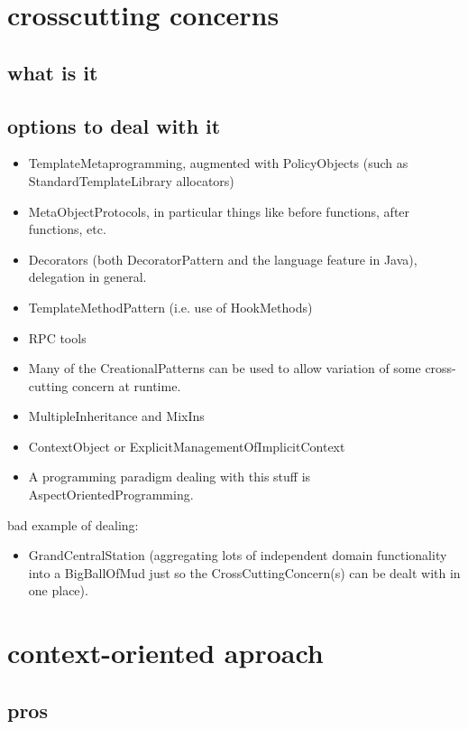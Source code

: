 \documentclass[11pt]{article}
\author{Willian Ver Valen Paiva}
\date{\today}
\title{}
\begin{document}
\tableofcontents

\section{crosscutting concerns}
\label{sec:orgfdc5866}
\subsection{what is it}
\label{sec:org8aa4fdf}
\subsection{options to deal with it}
\label{sec:org07f5d17}
\begin{itemize}
\item TemplateMetaprogramming, augmented with PolicyObjects (such as StandardTemplateLibrary allocators)
\item MetaObjectProtocols, in particular things like before functions, after functions, etc.
\item Decorators (both DecoratorPattern and the language feature in Java), delegation in general.
\item TemplateMethodPattern (i.e. use of HookMethods)
\item RPC tools
\item Many of the CreationalPatterns can be used to allow variation of some cross-cutting concern at runtime.
\item MultipleInheritance and MixIns
\item ContextObject or ExplicitManagementOfImplicitContext
\item A programming paradigm dealing with this stuff is AspectOrientedProgramming.
\end{itemize}

bad example of dealing:
\begin{itemize}
\item GrandCentralStation (aggregating lots of independent domain functionality into a BigBallOfMud just so the CrossCuttingConcern(s) can be dealt with in one place).
\end{itemize}

\section{context-oriented aproach}
\label{sec:orgd8d9240}
\subsection{pros}
\label{sec:org5d82f5c}
\end{document}

